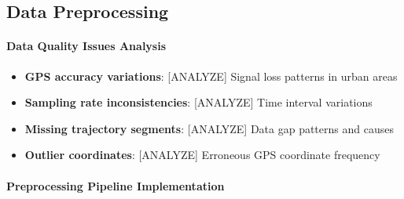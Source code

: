\documentclass[runningheads]{llncs}
\begin{document}

\subsection{Data Preprocessing}
\label{sec:preprocessing}


\paragraph{Data Quality Issues Analysis}

\begin{itemize}
\item \textbf{GPS accuracy variations}: [ANALYZE] Signal loss patterns in urban areas
\item \textbf{Sampling rate inconsistencies}: [ANALYZE] Time interval variations
\item \textbf{Missing trajectory segments}: [ANALYZE] Data gap patterns and causes
\item \textbf{Outlier coordinates}: [ANALYZE] Erroneous GPS coordinate frequency
\end{itemize}

\paragraph{Preprocessing Pipeline Implementation}
\end{document}
